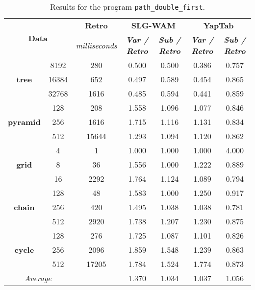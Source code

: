 \begin{table}[ht]
\centering
\footnotesize{
  \begin{tabular}{cc|c|cc|cc}
   \hline
    \hline
    \multicolumn{2}{c|}{\multirow{2}{*}{\small{\textbf{Data}}}} & \textbf{\small{Retro}} & \multicolumn{2}{c|}{\small{\textbf{SLG-WAM}}} & \multicolumn{2}{c}{\small{\textbf{YapTab}}} \\
     \multicolumn{2}{c|}{} & \scriptsize{\textit{milliseconds}} & \textbf{\textit{\scriptsize{Var / Retro}}} & \textbf{\textit{\scriptsize{Sub / Retro}}} & \textbf{\textit{\scriptsize{Var / Retro}}} & \textbf{\textit{\scriptsize{Sub / Retro}}} \\
   \hline
   \hline

\multirow{3}{*}{\textbf{tree}} &  8192 &  280 &  0.500  &  0.500  &  0.386 & 0.757 \\
&  16384 &  652 &  0.497  &  0.589  &  0.454 & 0.865 \\
&  32768 &  1616 &  0.485  &  0.594  &  0.441 & 0.859 \\
\hline
\multirow{3}{*}{\textbf{pyramid}} &  128 &  208 &  1.558  &  1.096  &  1.077 & 0.846 \\
&  256 &  1616 &  1.715  &  1.116  &  1.131 & 0.834 \\
&  512 &  15644 &  1.293  &  1.094  &  1.120 & 0.862 \\
\hline
\multirow{3}{*}{\textbf{grid}} &  4 &  1 &  1.000  &  1.000  &  1.000 & 4.000 \\
&  8 &  36 &  1.556  &  1.000  &  1.222 & 0.889 \\
&  16 &  2292 &  1.764  &  1.124  &  1.089 & 0.794 \\
\hline
\multirow{3}{*}{\textbf{chain}} &  128 &  48 &  1.583  &  1.000  &  1.250 & 0.917 \\
&  256 &  420 &  1.495  &  1.038  &  1.038 & 0.781 \\
&  512 &  2920 &  1.738  &  1.207  &  1.230 & 0.875 \\
\hline
\multirow{3}{*}{\textbf{cycle}} &  128 &  276 &  1.725  &  1.087  &  1.101 & 0.826 \\
&  256 &  2096 &  1.859  &  1.548  &  1.239 & 0.863 \\
&  512 &  17205 &  1.784  &  1.524  &  1.774 & 0.873 \\
\hline
\hline
\multicolumn{2}{c}{\textit{Average}} & & 1.370 & 1.034 & 1.037 & 1.056 \\ 
\hline
\hline
\end{tabular}
}
\caption{Results for the program \texttt{path\_double\_first}.}
\label{tbl:prefix_path_double_first}
\end{table}

